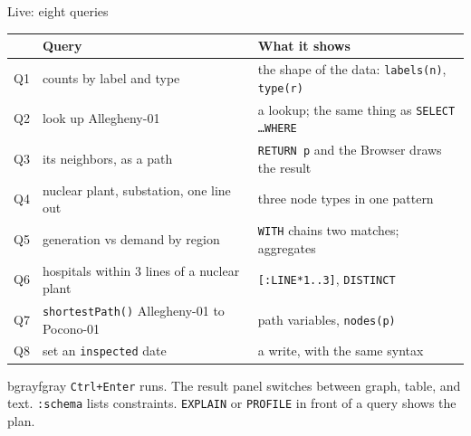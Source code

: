 \documentclass[aspectratio=169, 10pt]{beamer}
\begin{document}
\begin{frame}[fragile]{Live: eight queries}
  \vspace{0.15cm}
  \footnotesize
  \begin{tabular}{@{}cp{3.8cm}p{7.5cm}@{}}\toprule
    & \textbf{Query} & \textbf{What it shows}\\ \midrule
    Q1 & counts by label and type & the shape of the data: \texttt{labels(n)}, \texttt{type(r)}\\
    Q2 & look up Allegheny-01 & a lookup; the same thing as \texttt{SELECT \ldots WHERE}\\
    Q3 & its neighbors, as a path & \texttt{RETURN p} and the Browser draws the result\\
    Q4 & nuclear plant, substation, one line out & three node types in one pattern\\
    Q5 & generation vs demand by region & \texttt{WITH} chains two matches; aggregates\\
    Q6 & hospitals within 3 lines of a nuclear plant & \texttt{[:LINE*1..3]}, \texttt{DISTINCT}\\
    Q7 & \texttt{shortestPath()} Allegheny-01 to Pocono-01 & path variables, \texttt{nodes(p)}\\
    Q8 & set an \texttt{inspected} date & a write, with the same syntax\\ \bottomrule
  \end{tabular}
  \vspace{0.4cm}
  \begin{tbox}{bgray}{fgray}
    \texttt{Ctrl+Enter} runs. The result panel switches between graph, table, and text. \texttt{:schema} lists constraints. \texttt{EXPLAIN} or \texttt{PROFILE} in front of a query shows the plan.
  \end{tbox}
\end{frame}
\end{document}
